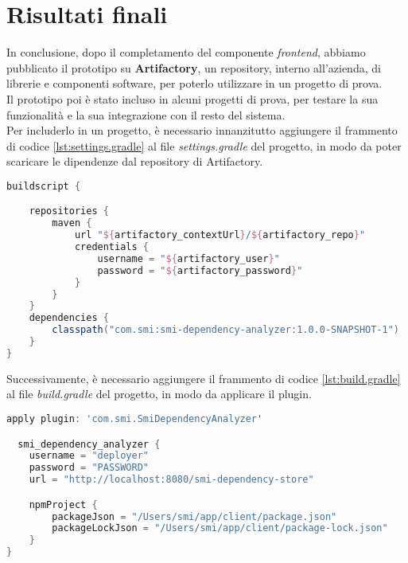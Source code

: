 \section{Risultati finali}
In conclusione, dopo il completamento del componente \textit{frontend}, abbiamo pubblicato il prototipo 
su \textbf{Artifactory}, un repository, interno all'azienda,  di librerie e componenti software, per poterlo utilizzare
in un progetto di prova.\\
Il prototipo poi è stato incluso in alcuni progetti di prova, per testare la sua funzionalità e la sua integrazione
con il resto del sistema.\\
Per includerlo in un progetto, è necessario innanzitutto aggiungere il frammento di codice \ref{lst:settings.gradle} al file \textit{settings.gradle} del progetto,
in modo da poter scaricare le dipendenze dal repository di Artifactory.\\
\begin{lstlisting}[language=Groovy, 
  caption=Configurazione per includere la dipendenza del \textit{plugin} in un progetto,
  label=lst:settings.gradle
  ]
  buildscript {

    repositories {
        maven {
            url "${artifactory_contextUrl}/${artifactory_repo}"
            credentials {
                username = "${artifactory_user}"
                password = "${artifactory_password}"
            }
        }
    }
    dependencies {
        classpath("com.smi:smi-dependency-analyzer:1.0.0-SNAPSHOT-1")
    }
}
\end{lstlisting}

Successivamente, è necessario aggiungere il frammento di codice \ref{lst:build.gradle} al file \textit{build.gradle} del progetto,
in modo da applicare il plugin.\\

\begin{lstlisting}[language=Groovy, 
  caption=Configurazione per applicare il \textit{plugin} in un progetto,
  label=lst:build.gradle
  ]
  apply plugin: 'com.smi.SmiDependencyAnalyzer'

  smi_dependency_analyzer {
    username = "deployer"
    password = "PASSWORD"
    url = "http://localhost:8080/smi-dependency-store"

    npmProject {
        packageJson = "/Users/smi/app/client/package.json"
        packageLockJson = "/Users/smi/app/client/package-lock.json"
    }
}

\end{lstlisting}

